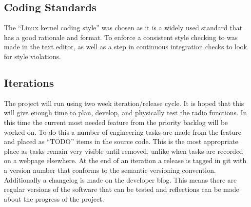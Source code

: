 \subsection*{Coding Standards}
The ``Linux kernel coding style''\cite{linux_coding_style} was chosen as it is a widely used standard that has a good rationale and format. To enforce a consistent style checking to was made in the text editor, as well as a step in continuous integration checks to look for style violations.

\subsection*{Iterations}
The project will run using two week iteration/release cycle. It is hoped that this will give enough time to plan, develop, and physically test the radio functions. In this time the current most needed feature from the priority backlog will be worked on. To do this a number of engineering tasks are made from the feature and placed as ``TODO'' items in the source code. This is the most appropriate place as tasks remain very visible until removed, unlike when tasks are recorded on a webpage elsewhere.  At the end of an iteration a release is tagged in git with a version number that conforms to the semantic versioning convention\cite{sem_ver}. Additionally a changelog is made on the developer blog. This means there are regular versions of the software that can be tested and reflections can be made about the progress of the project.
